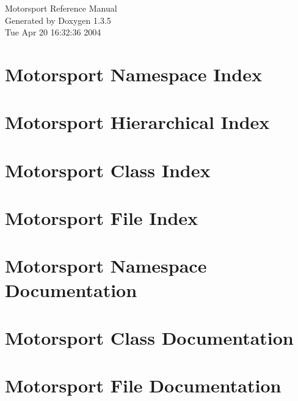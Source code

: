 \documentclass[a4paper]{book}
\begin{document}
\begin{titlepage}
\vspace*{7cm}
\begin{center}
{\Large Motorsport Reference Manual}\\
\vspace*{1cm}
{\large Generated by Doxygen 1.3.5}\\
\vspace*{0.5cm}
{\small Tue Apr 20 16:32:36 2004}\\
\end{center}
\end{titlepage}
\clearemptydoublepage
{}
\tableofcontents
\clearemptydoublepage
{}
\chapter{Motorsport Namespace Index}

\chapter{Motorsport Hierarchical Index}

\chapter{Motorsport Class Index}

\chapter{Motorsport File Index}

\chapter{Motorsport Namespace Documentation}

\chapter{Motorsport Class Documentation}




















\chapter{Motorsport File Documentation}






















\printindex
\end{document}
